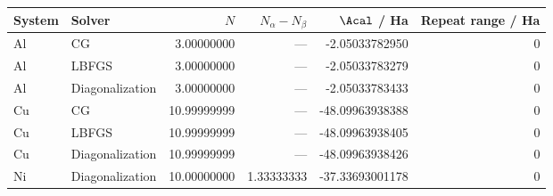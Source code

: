 \begin{tabular}{llrrrr}\toprule
System & Solver & $N$ & $N_\alpha-N_\beta$ & $\Acal$ / Ha & Repeat range / Ha\\\midrule
Al & CG & 3.00000000 & --- & -2.05033782950 & $0$\\
Al & LBFGS & 3.00000000 & --- & -2.05033783279 & $0$\\
Al & Diagonalization & 3.00000000 & --- & -2.05033783433 & $0$\\
Cu & CG & 10.99999999 & --- & -48.09963938388 & $0$\\
Cu & LBFGS & 10.99999999 & --- & -48.09963938405 & $0$\\
Cu & Diagonalization & 10.99999999 & --- & -48.09963938426 & $0$\\
Ni & Diagonalization & 10.00000000 & 1.33333333 & -37.33693001178 & $0$\\
\bottomrule\end{tabular}

